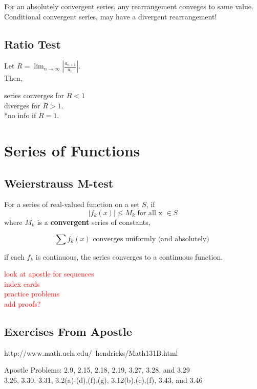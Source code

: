 \documentclass[12pt]{article}
\begin{document}
\begin{itemize}
For an absolutely convergent series, any rearrangement conveges to same value.\\

Conditional convergent series, may have a divergent rearrangement!

\subsection*{Ratio Test}

Let $R = \lim_{n \rightarrow \infty} |\frac{a_{n+1}}{a_n}|$. \\
Then, 
\begin{center}
series converges for $R < 1$\\
diverges for $R > 1$. \\
*no info if $R =1$.
\end{center}


\section*{Series of Functions}

\subsection*{Weierstrauss M-test}

For a series of real-valued function on a set $S$, if 
$$|f_k(x)| \leq M_k \text{ \ \ \ for all x } \in S$$
where $M_k$ is a \textbf{convergent} series of constants, 

$$\sum f_k(x) \text{ converges uniformly (and absolutely) }$$

\noindent * if each $f_k$ is continuous, the series converges to a continuous function.


\textcolor{red}{look at apostle for sequences\\
index cards \\
practice problems \\
add proofs?}

\subsection*{Exercises From Apostle}
http://www.math.ucla.edu/~hendricks/Math131B.html

 Apostle Problems: 2.9, 2.15, 2.18, 2.19, 3.27, 3.28, and 3.29\\
3.26, 3.30, 3.31, 3.2(a)-(d),(f),(g), 3.12(b),(c),(f), 3.43, and 3.46\\


\end{itemize}
\end{document}
